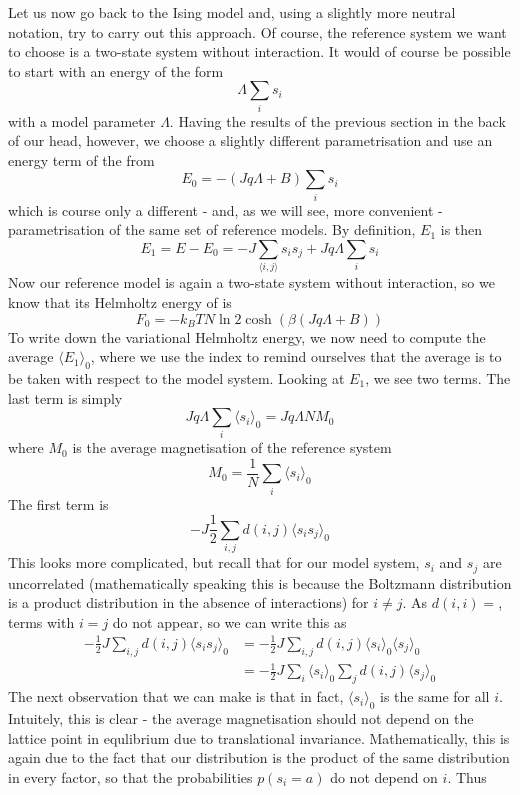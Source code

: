 \documentclass[a4paper, draft]{article}
\theoremstyle{own}
\theoremstyle{remark}
\begin{document}
Let us now go back to the Ising model and, using a slightly more neutral notation, try to carry out this approach. Of course, the reference system we want to choose is a two-state system without interaction. It would of course be possible to start with an energy of the form
$$
\Lambda  \sum_i s_i
$$
with a model parameter $\Lambda$. Having the results of the previous section in the back of our head, however, we choose a slightly different parametrisation and use an energy term of the from 
$$
E_0 = - (J q \Lambda + B) \sum_i s_i
$$ 
which is course only a different - and, as we will see, more convenient - parametrisation of the same set of reference models. By definition, $E_1$ is then 
$$
E_1 = E - E_0 = - J \sum_{\langle i, j\rangle} s_i s_j  +  J q \Lambda  \sum_i s_i
$$
Now our reference model is again a two-state system without interaction, so we know that its Helmholtz energy of is
$$
F_0 = - k_B T N \ln 2 \cosh(\beta (J q \Lambda + B))
$$
To write down the variational Helmholtz energy, we now need to compute the average $\langle E_1 \rangle_0$, where we use the index to remind ourselves that the average is to be taken with respect to the model system. Looking at $E_1$, we see two terms. The last term is simply
$$
J q \Lambda \sum_i \langle s_i \rangle_0 = J q \Lambda N M_0 
$$
where $M_0$ is the average magnetisation of the reference system
$$
M_0 = \frac{1}{N} \sum_i \langle s_i \rangle_0 
$$
The first term is
$$
- J \frac{1}{2} \sum_{i, j} d(i, j) \langle s_i s_j \rangle_0
$$
This looks more complicated, but recall that for our model system, $s_i$ and $s_j$ are uncorrelated (mathematically speaking this is because the Boltzmann distribution is a product distribution in the absence of interactions) for $i \neq j$. As $d(i, i) = $, terms with $i = j$ do not appear, so we can write this as
\begin{align*}
- \frac{1}{2} J  \sum_{i, j} d(i, j) \langle s_i s_j \rangle_0 &= - \frac{1}{2} J  \sum_{i, j} d(i, j) \langle s_i\rangle_0 \langle s_j \rangle_0 \\
&= - \frac{1}{2} J \sum_i \langle s_i\rangle_0 \sum_j d(i, j)  \langle s_j \rangle_0
\end{align*}
The next observation that we can make is that in fact, $\langle s_i \rangle_0$ is the same for all $i$. Intuitely, this is clear - the average magnetisation should not depend on the lattice point in equlibrium due to translational invariance. Mathematically, this is again due to the fact that our distribution is the product of the same distribution in every factor, so that the probabilities $p(s_i = a)$ do not depend on $i$. Thus
\end{document}
